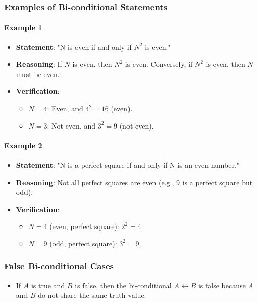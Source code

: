 \documentclass{article}
\begin{document}
\subsubsection{Examples of Bi-conditional Statements}

\paragraph{Example 1}
\begin{itemize}
    \item \textbf{Statement}: "N is even if and only if $N^2$ is even."
    \item \textbf{Reasoning}: If $N$ is even, then $N^2$ is even. Conversely, if $N^2$ is even, then $N$ must be even.
    \item \textbf{Verification}:
    \begin{itemize}
        \item $N = 4$: Even, and $4^2 = 16$ (even).
        \item $N = 3$: Not even, and $3^2 = 9$ (not even).
    \end{itemize}
\end{itemize}

\paragraph{Example 2}
\begin{itemize}
    \item \textbf{Statement}: "N is a perfect square if and only if N is an even number."
    \item \textbf{Reasoning}: Not all perfect squares are even (e.g., $9$ is a perfect square but odd).
    \item \textbf{Verification}:
    \begin{itemize}
        \item $N = 4$ (even, perfect square): $2^2 = 4$.
        \item $N = 9$ (odd, perfect square): $3^2 = 9$.
    \end{itemize}
\end{itemize}

\subsubsection{False Bi-conditional Cases}
\begin{itemize}
    \item If $A$ is true and $B$ is false, then the bi-conditional $A \leftrightarrow B$ is false because $A$ and $B$ do not share the same truth value.
\end{itemize}
\end{document}
